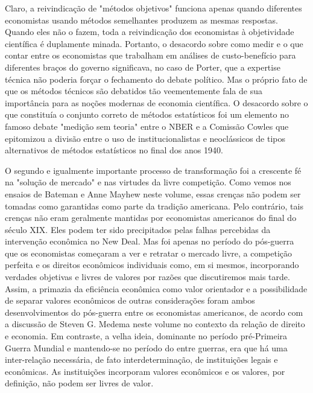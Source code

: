 \documentclass[12pt]{article}
\begin{document}
Claro, a reivindicação de "métodos objetivos" funciona apenas quando diferentes economistas usando métodos semelhantes produzem as mesmas respostas. Quando eles não o fazem, toda a reivindicação dos economistas à objetividade científica é duplamente minada. Portanto, o desacordo sobre como medir e o que contar entre os economistas que trabalham em análises de custo-benefício para diferentes braços do governo significava, no caso de Porter, que a expertise técnica não poderia forçar o fechamento do debate político. Mas o próprio fato de que os métodos técnicos são debatidos tão veementemente fala de sua importância para as noções modernas de economia científica. O desacordo sobre o que constituía o conjunto correto de métodos estatísticos foi um elemento no famoso debate "medição sem teoria" entre o NBER e a Comissão Cowles que epitomizou a divisão entre o uso de institucionalistas e neoclássicos de tipos alternativos de métodos estatísticos no final dos anos 1940.

O segundo e igualmente importante processo de transformação foi a crescente fé na "solução de mercado" e nas virtudes da livre competição. Como vemos nos ensaios de Bateman e Anne Mayhew neste volume, essas crenças não podem ser tomadas como garantidas como parte da tradição americana. Pelo contrário, tais crenças não eram geralmente mantidas por economistas americanos do final do século XIX. Eles podem ter sido precipitados pelas falhas percebidas da intervenção econômica no New Deal. Mas foi apenas no período do pós-guerra que os economistas começaram a ver e retratar o mercado livre, a competição perfeita e os direitos econômicos individuais como, em si mesmos, incorporando verdades objetivas e livres de valores por razões que discutiremos mais tarde. Assim, a primazia da eficiência econômica como valor orientador e a possibilidade de separar valores econômicos de outras considerações foram ambos desenvolvimentos do pós-guerra entre os economistas americanos, de acordo com a discussão de Steven G. Medema neste volume no contexto da relação de direito e economia. Em contraste, a velha ideia, dominante no período pré-Primeira Guerra Mundial e mantendo-se no período do entre guerras, era que há uma inter-relação necessária, de fato interdeterminação, de instituições legais e econômicas. As instituições incorporam valores econômicos e os valores, por definição, não podem ser livres de valor.
\end{document}

